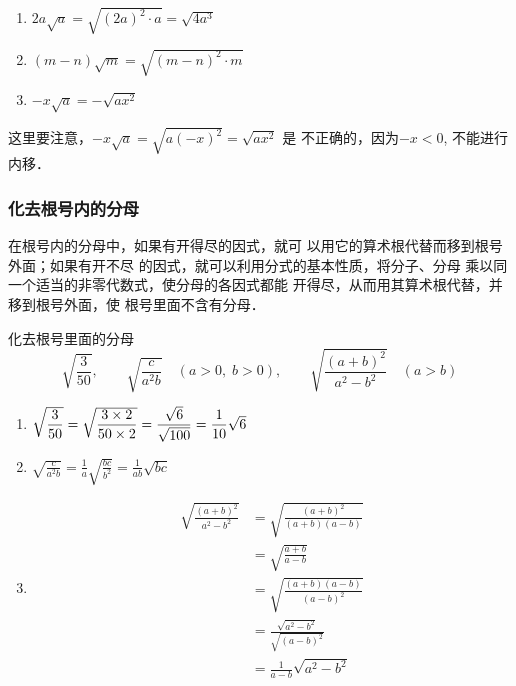 \begin{solution}
\begin{enumerate}
    \item $2a\sqrt{a}=\sqrt{(2a)^2\cdot a}=\sqrt{4a^3}$
    \item $(m-n)\sqrt{m}=\sqrt{(m-n)^2\cdot m}$
    \item $-x\sqrt{a}=-\sqrt{ax^2}$
\end{enumerate}
\end{solution}

这里要注意，$-x\sqrt{a}=\sqrt{a(-x)^2}=\sqrt{ax^2}$
是
不正确的，因为$-x<0$, 不能进行内移．

\subsubsection{化去根号内的分母}
在根号内的分母中，如果有开得尽的因式，就可
以用它的算术根代替而移到根号外面；如果有开不尽
的因式，就可以利用分式的基本性质，将分子、分母
乘以同一个适当的非零代数式，使分母的各因式都能
开得尽，从而用其算术根代替，并移到根号外面，使
根号里面不含有分母．
\begin{example}
    化去根号里面的分母
\[\sqrt{\frac{3}{50}},\qquad \sqrt{\frac{c}{a^2b}}\quad (a>0,\; b>0),\qquad \sqrt{\frac{(a+b)^2}{a^2-b^2}}\quad (a>b)\]
\end{example}

\begin{solution}    
\begin{enumerate}
    \item $\sqrt{\dfrac{3}{50}}=\sqrt{\dfrac{3\times2}{50\times2}}=\dfrac{\sqrt{6}}{\sqrt{100}}=\dfrac{1}{10}\sqrt{6}$
    \item $\sqrt{\frac{c}{a^2b}}=\frac{1}{a}\sqrt{\frac{bc}{b^2}}=\frac{1}{ab}\sqrt{bc}$
    \item \[\begin{split}
        \sqrt{\frac{(a+b)^2}{a^2-b^2}} &= \sqrt{\frac{(a+b)^2}{(a+b)(a-b)}}\\
        &=\sqrt{\frac{a+b}{a-b}}\\
        &=\sqrt{\frac{(a+b)(a-b)}{(a-b)^2}}\\
        &=\frac{\sqrt{a^2-b^2}}{\sqrt{(a-b)^2}}\\
        &=\frac{1}{a-b}\sqrt{a^2-b^2}
    \end{split}\]
\end{enumerate}

\end{solution}

